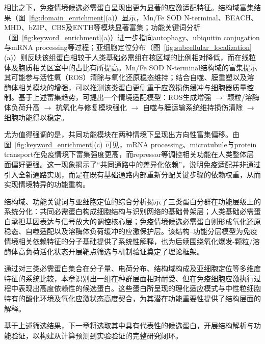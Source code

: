 相比之下，免疫情境候选必需蛋白呈现出更为显著的应激适配特征。结构域富集结果（图~\ref{fig:domain_enrichment}(a)）显示，Mn/Fe SOD N-terminal、BEACH、MHD、bZIP、CBS及ENTH等模块显著富集；功能关键词分析（图~\ref{fig:keyword_enrichment}(a)）进一步指向autophagy、ubiquitin conjugation与mRNA processing等过程；亚细胞定位分布（图~\ref{fig:subcellular_localization}(a)）则反映该组蛋白相较于人类基础必需组在核区域的比例相对降低，而在线粒体及胞质相关区室中的占比有所提高。Mn/Fe SOD N-terminal结构域的富集提示其可能参与活性氧（ROS）清除与氧化还原稳态维持；结合自噬、膜重塑以及溶酶体相关模块的增强，可以推测该类蛋白更侧重于应激损伤缓冲与细胞器质量控制\cite{skendros2018autophagy,pereira2024beach}。基于上述富集趋势，可提出一个情境适配模型：ROS生成增强 $\rightarrow$ 颗粒/溶酶体负荷升高 $\rightarrow$ 抗氧化与修复模块强化 $\rightarrow$ 自噬与膜运输系统维持损伤清除 $\rightarrow$ 细胞功能得以稳定。

尤为值得强调的是，共同功能模块在两种情境下呈现出方向性富集偏移。由图~\ref{fig:keyword_enrichment}(c) 可见，mRNA processing、microtubule与protein transport在免疫情境下富集强度更高，而repressor等调控相关功能在人类整体层面偏好更强。这一现象揭示了“共同通路中的差异化依赖”，说明免疫适配并非通过引入全新通路实现，而是在既有基础通路内部重新分配关键步骤的依赖权重，从而实现情境特异的功能重构。

结构域、功能关键词与亚细胞定位的综合分析揭示了三类蛋白分群在功能层级上的系统分化：共同必需蛋白构成细胞结构与识别网络的基础骨架层；人类基础必需蛋白承担基因表达与信号放大的调控核心层；免疫情境候选必需蛋白则形成氧化还原稳态、自噬适配以及溶酶体负荷缓冲的应激保护层。该结构--功能分层模型为免疫情境相关依赖特征的分子基础提供了系统性解释，也为后续围绕氧化爆发-颗粒/溶酶体高负荷活化状态开展靶点筛选与机制验证奠定了理论框架。

通过对三类必需蛋白集合在分子量、电荷分布、结构域构成及亚细胞定位等多维度特征的系统比较，本章识别出一组在种群层面相对耐受、但在免疫细胞应激执行过程中表现出高度依赖性的候选蛋白。这些蛋白所呈现的理化适应模式与中性粒细胞特有的酸化环境及氧化应激状态高度契合，为其潜在功能重要性提供了结构层面的解释。

基于上述筛选结果，下一章将选取其中具有代表性的候选蛋白，开展结构解析与功能验证，以构建从计算预测到实验验证的完整研究闭环。

